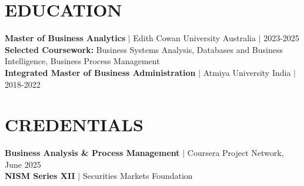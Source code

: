 \documentclass[letterpaper,10pt]{article}
\begin{document}
\section*{EDUCATION}
\textbf{Master of Business Analytics} $\vert$ Edith Cowan University \hfill Australia $\vert$ 2023-2025\\
\textbf{Selected Coursework:} Business Systems Analysis, Databases and Business Intelligence, Business Process Management\\
\textbf{Integrated Master of Business Administration} $\vert$ Atmiya University \hfill India $\vert$ 2018-2022

\section*{CREDENTIALS}
\textbf{Business Analysis \& Process Management} $\vert$ Coursera Project Network, June 2025\\
\textbf{NISM Series XII} $\vert$ Securities Markets Foundation
\end{document}
